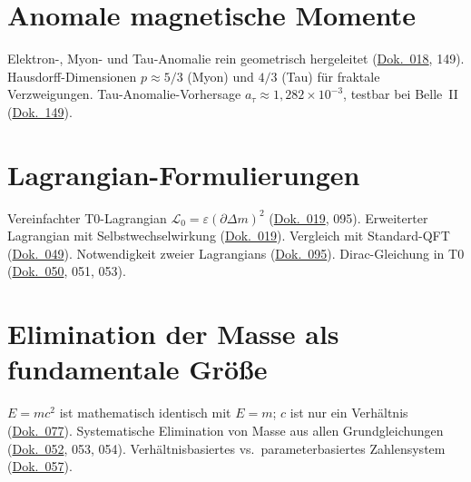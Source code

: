 \section{Anomale magnetische Momente}
Elektron-, Myon- und Tau-Anomalie rein geometrisch hergeleitet (\href{https://github.com/jpascher/T0-Time-Mass-Duality/blob/main/2/pdf/018_T0_Anomale-g2-10_De.pdf}{Dok.~018}, 149). Hausdorff-Dimensionen $p \approx 5/3$ (Myon) und $4/3$ (Tau) für fraktale Verzweigungen. Tau-Anomalie-Vorhersage $a_\tau \approx 1{,}282 \times 10^{-3}$, testbar bei Belle~II (\href{https://github.com/jpascher/T0-Time-Mass-Duality/blob/main/2/pdf/149_FFGFT-torsion_De.pdf}{Dok.~149}).

\section{Lagrangian-Formulierungen}
Vereinfachter T0-Lagrangian $\mathcal{L}_0 = \varepsilon(\partial\Delta m)^2$ (\href{https://github.com/jpascher/T0-Time-Mass-Duality/blob/main/2/pdf/019_T0_lagrndian_De.pdf}{Dok.~019}, 095). Erweiterter Lagrangian mit Selbstwechselwirkung (\href{https://github.com/jpascher/T0-Time-Mass-Duality/blob/main/2/pdf/019_T0_lagrndian_De.pdf}{Dok.~019}). Vergleich mit Standard-QFT (\href{https://github.com/jpascher/T0-Time-Mass-Duality/blob/main/2/pdf/049_LagrandianVergleich_De.pdf}{Dok.~049}). Notwendigkeit zweier Lagrangians (\href{https://github.com/jpascher/T0-Time-Mass-Duality/blob/main/2/pdf/095_Notwendigkeit_zwei_lagrange_De.pdf}{Dok.~095}). Dirac-Gleichung in T0 (\href{https://github.com/jpascher/T0-Time-Mass-Duality/blob/main/2/pdf/050_diracVereinfacht_De.pdf}{Dok.~050}, 051, 053).

\section{Elimination der Masse als fundamentale Größe}
$E = mc^2$ ist mathematisch identisch mit $E = m$; $c$ ist nur ein Verhältnis (\href{https://github.com/jpascher/T0-Time-Mass-Duality/blob/main/2/pdf/077_E-mc2_De.pdf}{Dok.~077}). Systematische Elimination von Masse aus allen Grundgleichungen (\href{https://github.com/jpascher/T0-Time-Mass-Duality/blob/main/2/pdf/052_EliminationOfMass_De.pdf}{Dok.~052}, 053, 054). Verhältnisbasiertes vs.\ parameterbasiertes Zahlensystem (\href{https://github.com/jpascher/T0-Time-Mass-Duality/blob/main/2/pdf/057_RelokativesZahlensystem_De.pdf}{Dok.~057}).

